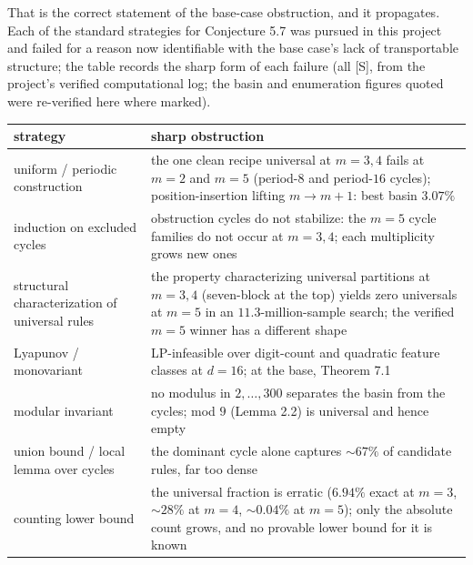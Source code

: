 \documentclass[11pt,letterpaper]{article}
\theoremstyle{paperstyle}
\theoremstyle{paperstyledef}
\theoremstyle{paperstylerem}
\begin{document}
That is the correct statement of the base-case obstruction, and it propagates. Each of the standard strategies for Conjecture 5.7 was pursued in this project and failed for a reason now identifiable with the base case's lack of transportable structure; the table records the sharp form of each failure (all {[}S{]}, from the project's verified computational log; the basin and enumeration figures quoted were re-verified here where marked).

{\def\LTcaptype{none} %
\begin{longtable}[]{@{}
  >{\raggedright\arraybackslash}p{}
  >{\raggedright\arraybackslash}p{}@{}}
\toprule\noalign{}
\begin{minipage}[b]{\linewidth}\raggedright
strategy
\end{minipage} & \begin{minipage}[b]{\linewidth}\raggedright
sharp obstruction
\end{minipage} \\
\midrule\noalign{}
\endhead
\bottomrule\noalign{}
\endlastfoot
uniform / periodic construction & the one clean recipe universal at \(m=3,4\) fails at \(m=2\) and \(m=5\) (period-\(8\) and period-\(16\) cycles); position-insertion lifting \(m \to m{+}1\): best basin \(3.07\%\) \\
induction on excluded cycles & obstruction cycles do not stabilize: the \(m=5\) cycle families do not occur at \(m = 3, 4\); each multiplicity grows new ones \\
structural characterization of universal rules & the property characterizing universal partitions at \(m = 3, 4\) (seven-block at the top) yields zero universals at \(m=5\) in an \(11.3\)-million-sample search; the verified \(m=5\) winner has a different shape \\
Lyapunov / monovariant & LP-infeasible over digit-count and quadratic feature classes at \(d = 16\); at the base, Theorem 7.1 \\
modular invariant & no modulus in \(2, \dots, 300\) separates the basin from the cycles; mod \(9\) (Lemma 2.2) is universal and hence empty \\
union bound / local lemma over cycles & the dominant cycle alone captures \({\sim}67\%\) of candidate rules, far too dense \\
counting lower bound & the universal fraction is erratic (\(6.94\%\) exact at \(m=3\), \({\sim}28\%\) at \(m=4\), \({\sim}0.04\%\) at \(m=5\)); only the absolute count grows, and no provable lower bound for it is known \\
\end{longtable}
}
\end{document}
